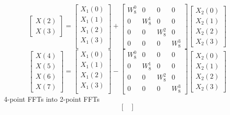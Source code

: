 \documentclass[journal,12pt,twocolumn]{IEEEtran}
\renewcommand\thesection{\arabic{section}}
\begin{document}
\begin{enumerate}[label=\thesection.\arabic*]
\begin{equation}
\begin{bmatrix}
		X(2) \\ 
		X(3)
	\end{bmatrix}
	=
	\begin{bmatrix}
		X_{1}(0) \\ 
		X_{1}(1)\\ 
		X_{1}(2)\\
		X_{1}(3)\\
	\end{bmatrix}
	+
	\begin{bmatrix}
		W^{0}_{8} & 0 & 0 & 0\\
		0 & W^{1}_{8} & 0 & 0\\
		0 & 0 & W^{2}_{8} & 0\\
		0 & 0 & 0 & W^{3}_{8}
	\end{bmatrix}
	\begin{bmatrix}
		X_{2}(0) \\ 
		X_{2}(1) \\ 
		X_{2}(2) \\
		X_{2}(3)
	\end{bmatrix}
	\label{eq:8-low}
\end{equation}
\begin{equation}
	\begin{bmatrix}
		X(4) \\ 
		X(5) \\ 
		X(6) \\ 
		X(7)
	\end{bmatrix}
	=
	\begin{bmatrix}
		X_{1}(0) \\ 
		X_{1}(1)\\ 
		X_{1}(2)\\
		X_{1}(3)\\
	\end{bmatrix}
	-
	\begin{bmatrix}
		W^{0}_{8} & 0 & 0 & 0\\
		0 & W^{1}_{8} & 0 & 0\\
		0 & 0 & W^{2}_{8} & 0\\
		0 & 0 & 0 & W^{3}_{8}
	\end{bmatrix}
	\begin{bmatrix}
		X_{2}(0) \\ 
		X_{2}(1) \\ 
		X_{2}(2) \\
		X_{2}(3)
	\end{bmatrix}
	\label{eq:8-high}
\end{equation}
4-point FFTs into 2-point FFTs
\begin{equation}
	\begin{bmatrix}

\end{bmatrix}
\end{equation}
\end{enumerate}
\end{document}
